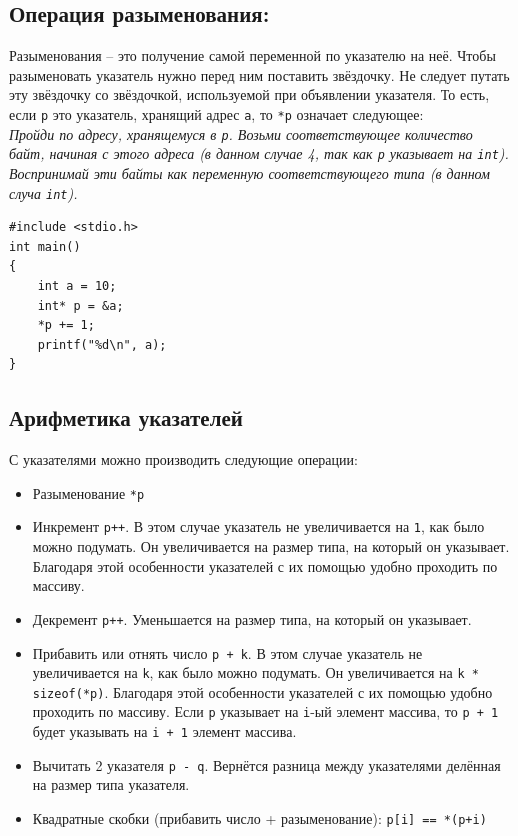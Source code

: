 \documentclass{article}
\begin{document}
\subsection*{Операция разыменования:}
Разыменования -- это получение самой переменной по указателю на неё. Чтобы разыменовать указатель нужно перед ним поставить звёздочку. Не следует путать эту звёздочку со звёздочкой, используемой при объявлении указателя. То есть, если \texttt{p} это указатель, хранящий адрес \texttt{a}, то \texttt{*p} означает следующее:\\

\textit{Пройди по адресу, хранящемуся в \texttt{p}. Возьми соответствующее количество байт, начиная с этого адреса (в данном случае 4, так как \texttt{p} указывает на \texttt{int}). Воспринимай эти байты как переменную соответствующего типа (в данном случа \texttt{int}).}

\begin{lstlisting}
#include <stdio.h>
int main() 
{
    int a = 10;
    int* p = &a;
    *p += 1;
    printf("%d\n", a);
}
\end{lstlisting}

\newpage
\subsection*{Арифметика указателей}
С указателями можно производить следующие операции:
\begin{itemize}
\item Разыменование \texttt{*p}
\item Инкремент \texttt{p++}. В этом случае указатель не увеличивается на \texttt{1}, как было можно подумать. Он увеличивается на размер типа, на который он указывает. Благодаря этой особенности указателей с их помощью удобно проходить по массиву.
\item Декремент \texttt{p++}. Уменьшается на размер типа, на который он указывает.
\item Прибавить или отнять число \texttt{p + k}. В этом случае указатель не увеличивается на \texttt{k}, как было можно подумать. Он увеличивается на \texttt{k * sizeof(*p)}. Благодаря этой особенности указателей с их помощью удобно проходить по массиву. Если \texttt{p} указывает на \texttt{i}-ый элемент массива, то \texttt{p + 1} будет указывать на \texttt{i + 1} элемент массива.
\item Вычитать 2 указателя \texttt{p - q}. Вернётся разница между указателями делённая на размер типа указателя.
\item Квадратные скобки (прибавить число + разыменование): \quad \texttt{p[i] == *(p+i)}
\end{itemize}
\end{document}
